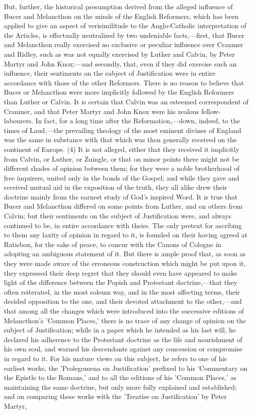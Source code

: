 \documentclass[
]{book}
\begin{document}
But, further, the historical presumption derived from the alleged influence of Bucer and Melancthon on the minds of the English Reformers, which has been applied to give an aspect of verisimilitude to the Anglo-Catholic interpretation of the Articles, is effectually neutralized by two undeniable facts,---first, that Bucer and Melancthon really exercised no exclusive or peculiar influence over Cranmer and Ridley, such as was not equally exercised by Luther and Calvin, by Peter Martyr and John Knox;---and secondly, that, even if they did exercise such an influence, their sentiments on the subject of Justification were in entire accordance with those of the other Reformers. There is no reason to believe that Bucer or Melancthon were more implicitly followed by the English Reformers than Luther or Calvin. It is certain that Calvin was an esteemed correspondent of Cranmer, and that Peter Martyr and John Knox were his zealous fellow-labourers. In fact, for a long time after the Reformation,---down, indeed, to the times of Laud,---the prevailing theology of the most eminent divines of England was the same in substance with that which was then generally received on the continent of Europe. (4) It is not alleged, either that they received it implicitly from Calvin, or Luther, or Zuingle, or that on minor points there might not be different shades of opinion between them; for they were a noble brotherhood of free inquirers, united only in the bonds of the Gospel; and while they gave and received mutual aid in the exposition of the truth, they all alike drew their doctrine mainly from the earnest study of God's inspired Word. It is true that Bucer and Melancthon differed on some points from Luther, and on others from Calvin; but their sentiments on the subject of Justification were, and always continued to be, in entire accordance with theirs. The only pretext for ascribing to them any laxity of opinion in regard to it, is founded on their having agreed at Ratisbon, for the sake of peace, to concur with the Canons of Cologne in adopting an ambiguous statement of it. But there is ample proof that, as soon as they were made aware of the erroneous construction which might be put upon it, they expressed their deep regret that they should even have appeared to make light of the difference between the Popish and Protestant doctrine,---that they often reiterated, in the most solemn way, and in the most affecting terms, their decided opposition to the one, and their devoted attachment to the other,---and that among all the changes which were introduced into the successive editions of Melancthon's 'Common Places,' there is no trace of any change of opinion on the subject of Justification; while in a paper which he intended as his last will, he declared his adherence to the Protestant doctrine as the life and nourishment of his own soul, and warned his descendants against any concession or compromise in regard to it. For his mature views on this subject, he refers to one of his earliest works, the 'Prolegomena on Justification' prefixed to his 'Commentary on the Epistle to the Romans,' and to all the editions of his 'Common Places,' as maintaining the same doctrine, but only more fully explained and established; and on comparing these works with the 'Treatise on Justification' by Peter Martyr, 
\end{document}
